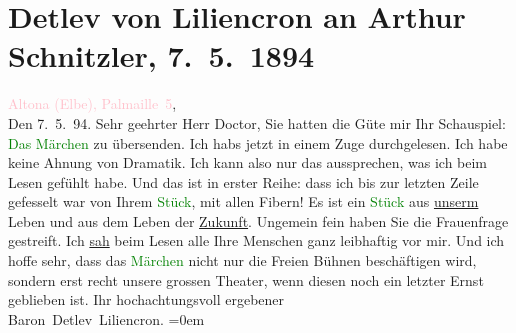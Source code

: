 

               \section[Detlev von Liliencron an Arthur Schnitzler, 7. 5. 1894]{ Detlev von Liliencron an Arthur Schnitzler, 7. 5. 1894}\nopagebreak{}\rehead{ }\normalsize\beginnumbering{} \toendnotes[C]{\smallbreak\pagebreak[2]} 
\toendnotes[C]{\smallbreak}\pstart
           \raggedleft{}{\pb}\textcolor{pink}{Altona (Elbe), Palmaille 5}{}\ledrightnote{\textcolor{pink}{Palmaille}},{\\}Den
                            7. 5. 94.\pend
           \pstart{}Sehr geehrter Herr Doctor,\pend\pstart
           Sie hatten die Güte mir Ihr Schauspiel: \textcolor{green}{Das
                        Märchen}{}\ledrightnote{\textcolor{green}{Das Märchen. Schauspiel in drei Aufzügen}} zu übersenden.\pend
           \pstart
           Ich habs jetzt in einem Zuge durchgelesen. Ich habe keine Ahnung von Dramatik.
                    Ich kann also nur das aussprechen, was ich beim Lesen gefühlt habe. Und das ist
                    in erster Reihe: dass ich bis zur letzten Zeile gefesselt war von Ihrem \textcolor{green}{Stück}{}, mit allen Fibern! Es
                    ist ein \textcolor{green}{Stück}{} aus \uline{unserm} Leben und aus dem Leben der \uline{Zukunft}. Ungemein fein haben Sie die Frauenfrage
                    gestreift. Ich \uline{sah} beim Lesen alle Ihre Menschen
                    ganz leibhaftig vor mir. Und ich hoffe sehr, dass das \textcolor{green}{Märchen}{}\ledrightnote{\textcolor{green}{Das Märchen. Schauspiel in drei Aufzügen}} nicht nur die Freien Bühnen beschäftigen wird,
                    sondern erst recht unsere grossen Theater, wenn diesen noch ein letzter Ernst
                    geblieben ist.\pend
           \pstart
           Ihr hochachtungsvoll ergebener{\\[\baselineskip]}\spacefill\mbox{Baron Detlev Liliencron.}\pend
           \leftskip=0em{}\endnumbering{}  
      